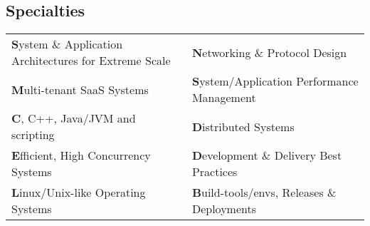 \documentclass[margin,line]{res}
\begin{document}
\begin{resume}
\section{\sc Specialties}
\vspace{.4cm}
\begin{tabular}{@{}p{3.3in}p{3.3in}}
{\bf S}ystem \& Application Architectures for Extreme Scale  &  {\bf N}etworking \& Protocol Design                        \\ [0.2cm]
{\bf M}ulti-tenant SaaS Systems                              &  {\bf S}ystem/Application Performance Management            \\ [0.2cm]
{\bf C}, C++, Java/JVM and scripting                         &  {\bf D}istributed Systems                                  \\ [0.2cm]
{\bf E}fficient, High Concurrency Systems                    &  {\bf D}evelopment \& Delivery Best Practices               \\ [0.2cm]
{\bf L}inux/Unix-like Operating Systems                      &  {\bf B}uild-tools/envs, Releases \& Deployments
\end{tabular}


\end{resume}
\end{document}
